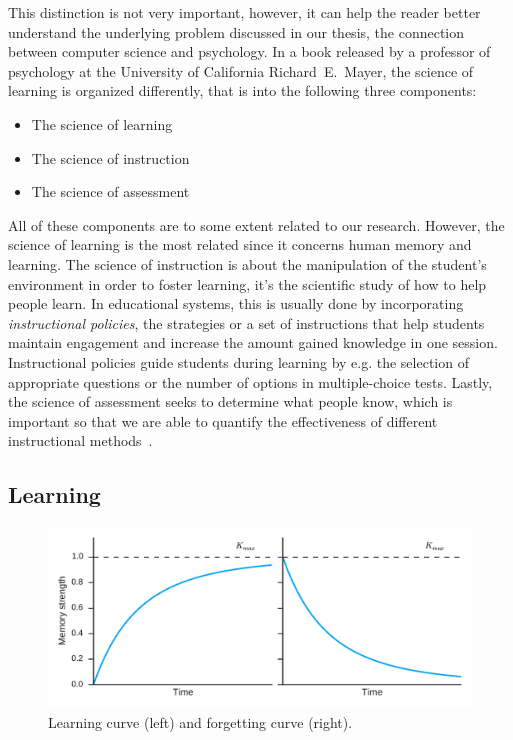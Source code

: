 This distinction is not very important, however, it can help the reader better understand the underlying problem discussed in our thesis, the connection between computer science and psychology. In a book released by a professor of psychology at the University of California Richard~E.~Mayer, the science of learning is organized differently, that is into the following three components:

\begin{itemize}
  \item The science of learning
  \item The science of instruction
  \item The science of assessment
\end{itemize}

All of these components are to some extent related to our research. However, the science of learning is the most related since it concerns human memory and learning. The science of instruction is about the manipulation of the student's environment in order to foster learning, it's the scientific study of how to help people learn. In educational systems, this is usually done by incorporating \textit{instructional policies}, the strategies or a set of instructions that help students maintain engagement and increase the amount gained knowledge in one session. Instructional policies guide students during learning by e.g. the selection of appropriate questions or the number of options in multiple-choice tests. Lastly, the science of assessment seeks to determine what people know, which is important so that we are able to quantify the effectiveness of different instructional methods~\cite{RichardE.Mayer2010}.

\subsection{Learning}

\begin{figure}[htbp]
  \centering
  \includegraphics[width=\textwidth]{img/learning-forgetting-curves}
  \caption{Learning curve (left) and forgetting curve (right).}
  \label{fig:learning-forgetting-curves}
\end{figure}

